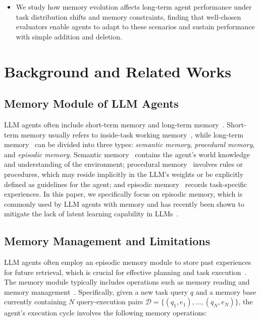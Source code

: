 \documentclass[11pt]{article}
\theoremstyle{plain}
\theoremstyle{definition}
\newcommand{\zhen}[1]{\textcolor{blue}{[Zhen: #1]}}
\begin{document}
\begin{itemize}[leftmargin=*]
\item We study how memory evolution affects long-term agent performance under task distribution shifts and memory constraints, finding that well-chosen evaluators enable agents to adapt to these scenarios and sustain performance with simple addition and deletion.
\end{itemize}


\section{Background and Related Works}
\label{related}

\subsection{Memory Module of LLM Agents}
LLM agents often include short-term memory and long-term memory~\cite{zhang2024survey}. Short-term memory usually refers to inside-task working memory~\cite{sumers2023cognitive}, while long-term memory~\cite{sumers2023cognitive} can be divided into three types: \textit{semantic memory}, \textit{procedural memory}, and \textit{episodic memory}. Semantic memory~\cite{Kumar2020SemanticMA} contains the agent's world knowledge and understanding of the environment; procedural memory~\cite{proceduralmemory} involves rules or procedures, which may reside implicitly in the LLM's weights or be explicitly defined as guidelines for the agent; and episodic memory~\cite{Nuxoll2007ExtendingCA,lampinen2025latentlearningepisodicmemory} records task-specific experiences. 
In this paper, we specifically focus on episodic memory, which is commonly used by LLM agents with memory and has recently been shown to mitigate the lack of latent learning capability in LLMs~\citep{lampinen2025latentlearningepisodicmemory}.

\subsection{Memory Management and Limitations}
LLM agents often employ an episodic memory module to store past experiences for future retrieval, which is crucial for effective planning and task execution~\cite{shi2024ehragent,mao2023language,xu2025mem,zhou2025agentfly,zhong2024memorybank,yin2024explicit}. 
The memory module typically includes operations such as memory reading and memory management~\cite{zhang2024survey}. 
Specifically, given a new task query $q$ and a memory base currently containing $N$ query-execution pairs $\mathcal{D} = \{(q_1, e_1), \ldots, (q_N, e_N)\}$, the agent's execution cycle involves the following memory operations:
\end{document}
